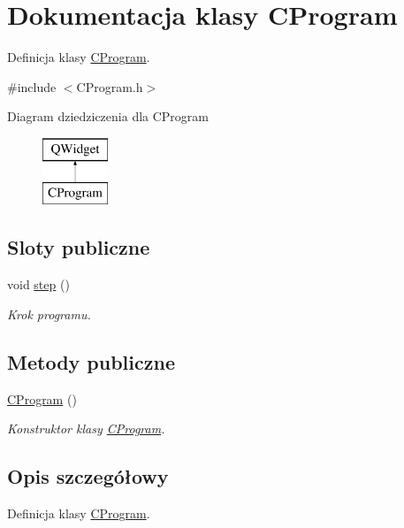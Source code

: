 \hypertarget{class_c_program}{}\section{Dokumentacja klasy C\+Program}
\label{class_c_program}


Definicja klasy \mbox{\hyperlink{class_c_program}{C\+Program}}.  




{\ttfamily \#include $<$C\+Program.\+h$>$}

Diagram dziedziczenia dla C\+Program\begin{figure}[H]
\begin{center}
\leavevmode
\includegraphics[height=2.000000cm]{class_c_program}
\end{center}
\end{figure}
\subsection*{Sloty publiczne}
\begin{DoxyCompactItemize}
\item 
void \mbox{\hyperlink{class_c_program_a643bd73f256632b72a7d6182e8e7d807}{step}} ()
\begin{DoxyCompactList}\small\item\em Krok programu. \end{DoxyCompactList}\end{DoxyCompactItemize}
\subsection*{Metody publiczne}
\begin{DoxyCompactItemize}
\item 
\mbox{\hyperlink{class_c_program_a74d3ca01d5e8b892f37684254ae546ed}{C\+Program}} ()
\begin{DoxyCompactList}\small\item\em Konstruktor klasy \mbox{\hyperlink{class_c_program}{C\+Program}}. \end{DoxyCompactList}\end{DoxyCompactItemize}


\subsection{Opis szczegółowy}
Definicja klasy \mbox{\hyperlink{class_c_program}{C\+Program}}. 

